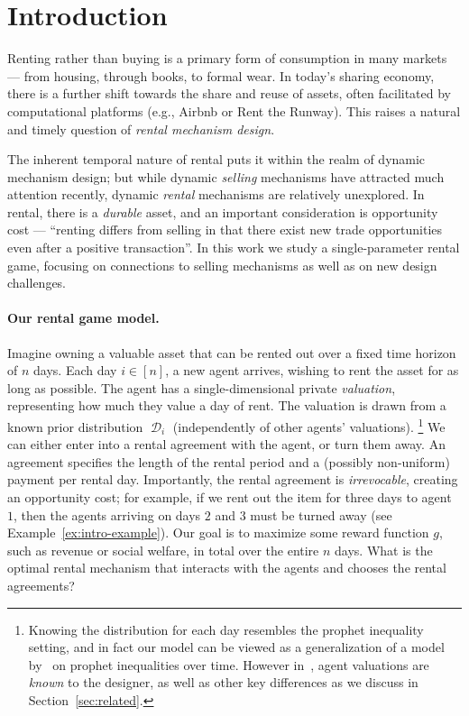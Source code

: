 \documentclass[11pt,letterpaper]{article}
\DeclareMathOperator{\D}{\mathcal{D}}
\theoremstyle{plain}
\begin{document}
\section{Introduction}\label{sec:intro}

Renting rather than buying is a primary form of consumption in many markets --- from housing, through books, to formal wear.
In today's sharing economy, there is a further shift towards the share and reuse of assets, often facilitated by computational platforms (e.g.,  
Airbnb or Rent the Runway).
This raises a natural and timely question of \emph{rental mechanism design}. 

The inherent temporal nature of rental puts it within the realm of dynamic mechanism design; but while dynamic \emph{selling} mechanisms have attracted much attention recently, dynamic \emph{rental} mechanisms are relatively unexplored. In rental, there is a \emph{durable} asset, and an important consideration is opportunity cost --- ``renting differs from selling in that there exist new trade opportunities even after a positive transaction''\cite{beccuti2020optimality}.
In this work we study a single-parameter 
rental game, focusing on connections to selling mechanisms as well as on new design challenges.

\paragraph{Our rental game model.} 

Imagine owning a valuable asset that can be rented out over a fixed time horizon of $n$ days.
Each day $i\in[n]$, a new agent arrives, wishing to rent the asset for as long as possible.
The agent has a single-dimensional private \emph{valuation}, representing how much they value a day of rent. 
The valuation is drawn from a known prior distribution $\D_i$ (independently of other agents' valuations).%
\footnote{Knowing the distribution for each day resembles the prophet inequality setting, and in fact 
our model can be viewed as a generalization of a model by~\cite{AbelsPS23} on prophet inequalities over time. However in~\cite{AbelsPS23}, agent valuations are \emph{known} to the designer, 
as well as other key differences as we discuss in Section~\ref{sec:related}.}
We can either enter into a rental agreement with the agent, or turn them away. 
An agreement specifies the length of the rental period and a (possibly non-uniform) payment per rental day. 
Importantly, the rental agreement is \emph{irrevocable}, creating an opportunity cost; for example, if we rent out the item for three days to agent $1$, then the agents arriving on days $2$ and $3$ must be turned away (see Example~\ref{ex:intro-example}).
Our goal is to maximize some reward function $g$,
such as revenue or social welfare, in total over the entire $n$ days.
What is the optimal rental mechanism that interacts with the agents and chooses the rental agreements? 
\end{document}
